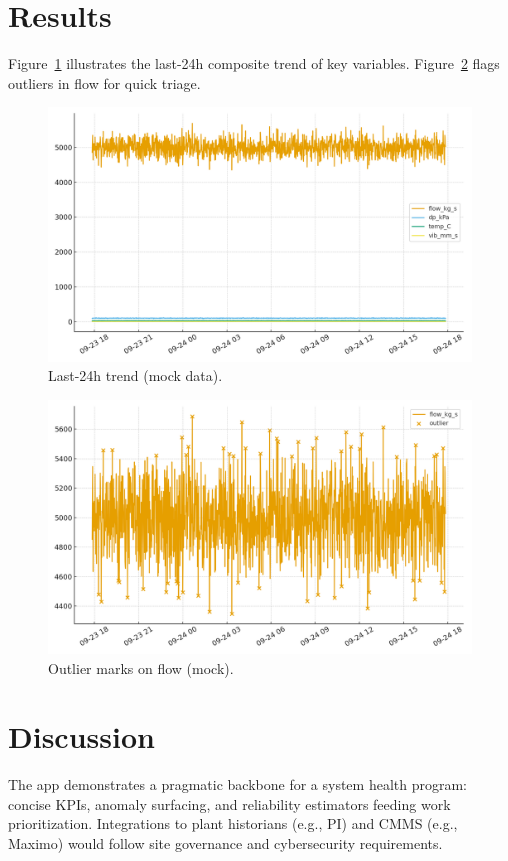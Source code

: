 \documentclass[11pt]{article}
\begin{document}
\section{Results}
Figure~\ref{fig:last24} illustrates the last-24h composite trend of key variables. Figure~\ref{fig:anom} flags outliers in flow for quick triage.
\begin{figure}[h]
\centering
\includegraphics[width=0.95\linewidth]{outputs_last24.png}
\caption{Last-24h trend (mock data).}
\label{fig:last24}
\end{figure}

\begin{figure}[h]
\centering
\includegraphics[width=0.95\linewidth]{outputs_anomalies.png}
\caption{Outlier marks on flow (mock).}
\label{fig:anom}
\end{figure}

\section{Discussion}
The app demonstrates a pragmatic backbone for a system health program: concise KPIs, anomaly surfacing, and reliability estimators feeding work prioritization. Integrations to plant historians (e.g., PI) and CMMS (e.g., Maximo) would follow site governance and cybersecurity requirements.
\end{document}
